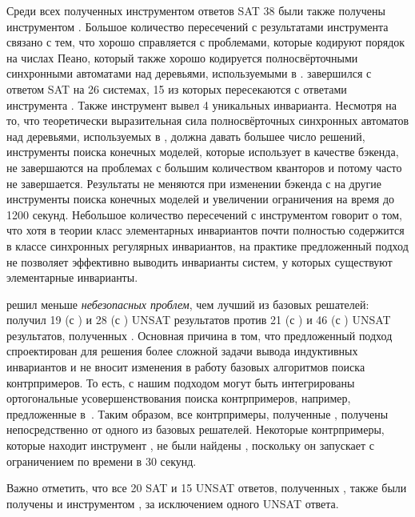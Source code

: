Среди всех полученных инструментом \eldarica{} ответов SAT 38 были также получены инструментом \ringenSync{}.
Большое количество пересечений с результатами инструмента \eldarica{} связано с тем, что \eldarica{} хорошо справляется с проблемами, которые кодируют порядок на числах Пеано, который также хорошо кодируется полносвёрточными синхронными автоматами над деревьями, используемыми в \ringenSync{}. \racer{} завершился с ответом SAT на 26 системах, 15 из которых пересекаются с ответами инструмента \ringenSync{}. Также инструмент \ringenSync{} вывел 4 уникальных инварианта. Несмотря на то, что теоретически выразительная сила полносвёрточных синхронных автоматов над деревьями, используемых в \ringenSync{}, должна давать большее число решений, инструменты поиска конечных моделей, которые \ringenSync{} использует в качестве бэкенда, не завершаются на проблемах с большим количеством кванторов и потому \ringenSync{} часто не завершается.
Результаты не меняются при изменении бэкенда с \cvc{} на другие инструменты поиска конечных моделей и увеличении ограничения на время до 1200 секунд. Небольшое количество пересечений с инструментом \racer{} говорит о том, что хотя в теории класс элементарных инвариантов почти полностью содержится в классе синхронных регулярных инвариантов, на практике предложенный подход не позволяет эффективно выводить инварианты систем, у которых существуют элементарные инварианты.

\textbf{\theringenCICI{}} решил меньше \textit{небезопасных проблем}, чем лучший из базовых решателей: \theringenCICI{} получил 19 (с \cvc{}) и 28 (с \vampire{}) UNSAT результатов против 21 (с \cvc{}) и 46 (с \vampire{}) UNSAT результатов, полученных \theringen{}. Основная причина в том, что предложенный подход спроектирован для решения более сложной задачи вывода индуктивных инвариантов и не вносит изменения в работу базовых алгоритмов поиска контрпримеров. То есть, с нашим подходом могут быть интегрированы ортогональные усовершенствования поиска контрпримеров, например, предложенные в~\cite{blicha2022transition}. Таким образом, все контрпримеры, полученные \theringenCICI{}, получены непосредственно от одного из базовых решателей. Некоторые контрпримеры, которые находит инструмент \theringen{}, не были найдены \theringenCICI{}, поскольку он запускает \theringen{} с ограничением по времени в 30 секунд. 

Важно отметить, что все 20 SAT и 15 UNSAT ответов, полученных \racer{}, также были получены и инструментом \theringenCICI{}, за исключением одного UNSAT ответа.

